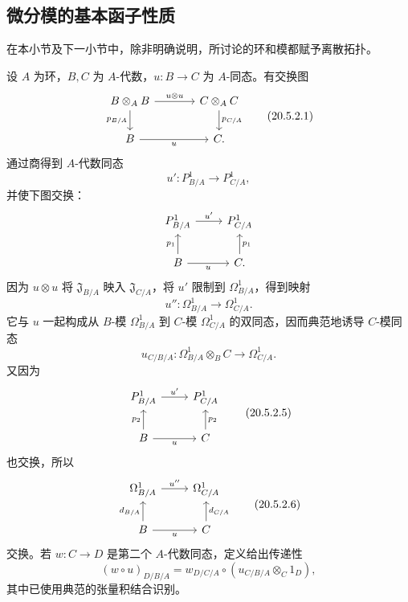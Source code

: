 \subsection{微分模的基本函子性质}
在本小节及下一小节中，除非明确说明，所讨论的环和模都赋予离散拓扑。

设 $A$ 为环，$B,C$ 为 $A$-代数，$u:B\to C$ 为 $A$-同态。有交换图
\begin{equation}
\begin{tikzcd}[column sep=large]
 B\otimes_A B\arrow[r,"u\otimes u"]\arrow[d,"p_{B/A}"']&C\otimes_A C\arrow[d,"p_{C/A}"]\\
 B\arrow[r,"u"']&C.
\end{tikzcd}
\tag{20.5.2.1}
\end{equation}
通过商得到 $A$-代数同态
\begin{equation}
 u':P^1_{B/A}\longrightarrow P^1_{C/A},
 \tag{20.5.2.2}
\end{equation}
并使下图交换：
\[
\begin{tikzcd}
 P^1_{B/A}\arrow[r,"u'"]&P^1_{C/A}\\
 B\arrow[u,"p_1"]\arrow[r,"u"']&C\arrow[u,"p_1"'].
\end{tikzcd}
\]
因为 $u\otimes u$ 将 $\mathfrak J_{B/A}$ 映入 $\mathfrak J_{C/A}$，将 $u'$ 限制到 $\Omega^1_{B/A}$，得到映射
\begin{equation}
 u'':\Omega^1_{B/A}\longrightarrow\Omega^1_{C/A}.
 \tag{20.5.2.3}
\end{equation}
它与 $u$ 一起构成从 $B$-模 $\Omega^1_{B/A}$ 到 $C$-模 $\Omega^1_{C/A}$ 的双同态，因而典范地诱导 $C$-模同态
\begin{equation}
 u_{C/B/A}:\Omega^1_{B/A}\otimes_B C\longrightarrow\Omega^1_{C/A}.
 \tag{20.5.2.4}
\end{equation}
又因为
\begin{equation}
\begin{tikzcd}
 P^1_{B/A}\arrow[r,"u'"]&P^1_{C/A}\\
 B\arrow[u,"p_2"]\arrow[r,"u"']&C\arrow[u,"p_2"']
\end{tikzcd}
\tag{20.5.2.5}
\end{equation}
也交换，所以
\begin{equation}
\begin{tikzcd}
 \Omega^1_{B/A}\arrow[r,"u''"]&\Omega^1_{C/A}\\
 B\arrow[u,"d_{B/A}"]\arrow[r,"u"']&C\arrow[u,"d_{C/A}"']
\end{tikzcd}
\tag{20.5.2.6}
\end{equation}
交换。若 $w:C\to D$ 是第二个 $A$-代数同态，定义给出传递性
\begin{equation}
 (w\circ u)_{D/B/A}
 =w_{D/C/A}\circ(u_{C/B/A}\otimes_C1_D),
 \tag{20.5.2.7}
\end{equation}
其中已使用典范的张量积结合识别。

